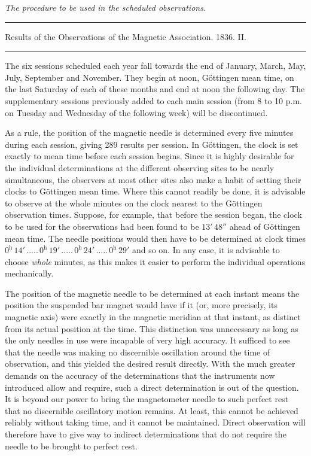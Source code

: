 \begin{center}
{\large\itshape The procedure to be used in the scheduled observations.\par}
\vspace{5mm}\hrule\vspace{2mm}
{\small Results of the Observations of the Magnetic Association. 1836. II.\par}
\vspace{2mm}\hrule\vspace{5mm}
\end{center}
The six sessions scheduled each year fall towards the end of January, March, May, July, September and November. They begin at noon, Göttingen mean time, on the last Saturday of each of these months and end at noon the following day. The supplementary sessions previously added to each main session (from 8 to 10 p.m. on Tuesday and Wednesday of the following week) will be discontinued.

As a rule, the position of the magnetic needle is determined every five minutes during each session, giving 289 results per session. In Göttingen, the clock is set exactly to mean time before each session begins. Since it is highly desirable for the individual determinations at the different observing sites to be nearly simultaneous, the observers at most other sites also make a habit of setting their clocks to Göttingen mean time. Where this cannot readily be done, it is advisable to observe at the whole minutes on the clock nearest to the Göttingen observation times. Suppose, for example, that before
the session began, the clock to be used for the observations had been found to be $13'\,48''$ ahead of Göttingen mean time. The needle positions would then have to be determined at clock times $0^{\mathrm h}\,14'\,.....\,0^{\mathrm h}\,19'\,.....\,0^{\mathrm h}\,24'\,.....\,0^{\mathrm h}\,29'$ and so on. In any case, it is advisable to choose \textit{whole} minutes, as this makes it easier to perform the individual operations mechanically.

The position of the magnetic needle to be determined at each instant means the position the suspended bar magnet would have if it (or, more precisely, its magnetic axis) were exactly in the magnetic meridian at that instant, as distinct from its actual position at the time. This distinction was unnecessary as long as the only needles in use were incapable of very high accuracy. It sufficed to see that the needle was making no discernible oscillation around the time of observation, and this yielded the desired result directly. With the much greater demands on the accuracy of the determinations that the instruments now introduced allow and require, such a direct determination is out of the question. It is beyond our power to bring the magnetometer needle to such perfect rest that no discernible oscillatory motion remains. At least, this cannot be achieved reliably without taking time, and it cannot be maintained. Direct observation will therefore have to give way to indirect determinations that do not require the needle to be brought to perfect rest.

